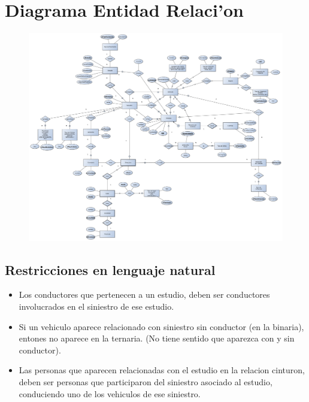 \section{Diagrama Entidad Relaci'on}

\begin{figure}[H]
	\begin{center}
		\includegraphics[scale=0.2]{imagenes/DER.pdf}
	\end{center}
\end{figure}

\subsection{Restricciones en lenguaje natural}

\begin{itemize}
\item Los conductores que pertenecen a un estudio, deben ser conductores involucrados en el siniestro de ese estudio.
\item Si un vehiculo aparece relacionado con siniestro sin conductor (en la binaria), entones no aparece en la ternaria. (No tiene sentido que aparezca con y sin conductor).
\item Las personas que aparecen relacionadas con el estudio en la relacion cinturon, deben ser personas que participaron del siniestro asociado al estudio, conduciendo uno de los vehiculos de ese siniestro.
\end{itemize}
